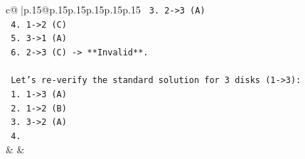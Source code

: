 \documentclass{article}
\begin{document}
{\begin{supertabular}{c@{$\;$}|p{.15\linewidth}@{}p{.15\linewidth}p{.15\linewidth}p{.15\linewidth}p{.15\linewidth}p{.15\linewidth}}
{{{\texttt{        3. 2{-}>3 (A)} \\
\texttt{        4. 1{-}>2 (C)} \\
\texttt{        5. 3{-}>1 (A)} \\
\texttt{        6. 2{-}>3 (C) {-}> **Invalid**.} \\
\\ 
\texttt{        Let's re{-}verify the standard solution for 3 disks (1{-}>3):} \\
\texttt{        1. 1{-}>3 (A)} \\
\texttt{        2. 1{-}>2 (B)} \\
\texttt{        3. 3{-}>2 (A)} \\
\texttt{        4.} \\
            }
        }
    }
    & & \\ \\


\end{supertabular}}
\end{document}
